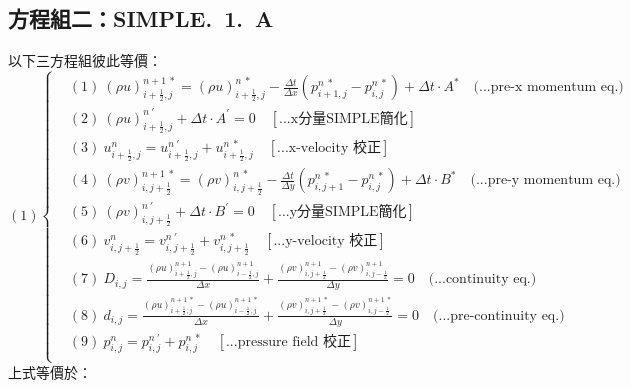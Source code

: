\documentclass[12pt]{article}
\begin{document}
\subsection{方程組二：SIMPLE.\ 1.\ A}
\label{1.A.s}
\noindent 以下三方程組彼此等價：\\
\begin{equation}
(1)
\left\{
\begin{aligned}
    &(1)\ (\rho u)_{i+\frac{1}{2},j}^{n+1\ *} = (\rho u)_{i+\frac{1}{2},j}^{n\ *} - \frac{\Delta t}{\Delta x}(p_{i+1,j}^{n\ *} - p_{i,j}^{n\ *}) + \Delta t \cdot A^{*}  \quad \text{(...pre-x momentum eq.)}\\[1.5ex]
    &(2)\ (\rho u)_{i+\frac{1}{2},j}^{n\ \prime} + \Delta t \cdot A^{\prime} = 0\quad \left[\text{...x分量SIMPLE簡化}\right]\\[1.5ex]
    &(3)\ u_{i+\frac{1}{2},j}^{n} = u_{i+\frac{1}{2},j}^{n\ \prime} + u_{i+\frac{1}{2},j}^{n\ *}  \quad \left[\text{...x-velocity 校正}\right]\\[1.5ex]
    &(4)\ (\rho v)_{i,j+\frac{1}{2}}^{n+1\ *} = (\rho v)_{i,j+\frac{1}{2}}^{n\ *} - \frac{\Delta t}{\Delta y}(p_{i,j+1}^{n\ *} - p_{i,j}^{n\ *}) + \Delta t \cdot B^{*}  \quad \text{(...pre-y momentum eq.)}\\[1.5ex]
    &(5)\ (\rho v)_{i,j+\frac{1}{2}}^{n\ \prime} + \Delta t \cdot B^{\prime} = 0 \quad\left[\text{...y分量SIMPLE簡化}\right]\\[1.5ex]
    &(6)\ v_{i,j+\frac{1}{2}}^{n} = v_{i,j+\frac{1}{2}}^{n\ \prime} + v_{i,j+\frac{1}{2}}^{n\ *} \quad \left[\text{...y-velocity 校正}\right]\\[1.5ex]
    &(7)\ D_{i,j} = \frac{(\rho u)_{i+\frac{1}{2},j}^{n+1} - (\rho u)_{i-\frac{1}{2},j}^{n+1}}{\Delta x} + \frac{(\rho v)_{i,j+\frac{1}{2}}^{n+1} - (\rho v)_{i,j-\frac{1}{2}}^{n+1}}{\Delta y} = 0 \quad \text{(...continuity eq.)}\\[1.5ex]
    &(8)\ d_{i,j} = \frac{(\rho u)_{i+\frac{1}{2},j}^{n+1\ *} - (\rho u)_{i-\frac{1}{2},j}^{n+1\ *}}{\Delta x} + \frac{(\rho v)_{i,j+\frac{1}{2}}^{n+1\ *} - (\rho v)_{i,j-\frac{1}{2}}^{n+1\ *}}{\Delta y} = 0 \quad \text{(...pre-continuity eq.)}\\[1.5ex]
    &(9)\ p_{i,j}^{n} = p_{i,j}^{n\ \prime} + p_{i,j}^{n\ *} \quad\left[\text{...pressure field 校正}\right]\\[1.5ex]
\end{aligned}
\right.
\end{equation}
\noindent 上式等價於：\\
\end{document}
